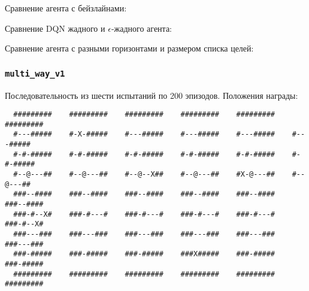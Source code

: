 \documentclass[a4paper]{article}
\begin{document}
Сравнение агента с бейзлайнами:


Сравнение DQN жадного и $\epsilon$-жадного агента:


Сравнение агента с разными горизонтами и размером списка целей:

  

  

  
  
\subsubsection{\texttt{multi\_way\_v1}}

Последовательность из шести испытаний по 200 эпизодов. Положения награды:

\begin{verbatim}
  #########    #########    #########    #########    #########    #########
  #---#####    #-X-#####    #---#####    #---#####    #---#####    #---#####
  #-#-#####    #-#-#####    #-#-#####    #-#-#####    #-#-#####    #-#-#####
  #--@---##    #--@---##    #--@--X##    #--@---##    #X-@---##    #--@---##
  ###--####    ###--####    ###--####    ###--####    ###--####    ###--####
  ###-#--X#    ###-#---#    ###-#---#    ###-#---#    ###-#---#    ###-#--X#
  ###---###    ###---###    ###---###    ###---###    ###---###    ###---###
  ###-#####    ###-#####    ###-#####    ###X#####    ###-#####    ###-#####
  #########    #########    #########    #########    #########    #########
\end{verbatim}
\end{document}
